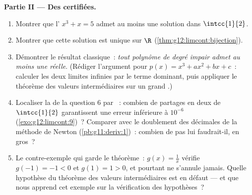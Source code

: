 \begin{problem}
\medskip
\noindent\textbf{Partie II --- Des  certifiées.}
\begin{enumerate}[resume]
  \item Montrer que l' $x^3 + x = 5$ admet au moins une
        solution dans $\intcc{1}{2}$.
  \item Montrer que cette solution est unique sur $\R$
        (\cref{thm:g12:limcont:bijection}).
  \item Démontrer le résultat classique~: \emph{tout polynôme de
        degré impair admet au moins une  réelle}. (Rédiger
        l'argument pour $p(x) = x^3 + a x^2 + b x + c$~: calculer
        les deux limites infinies par le terme dominant, puis
        appliquer le théorème des valeurs intermédiaires sur un
        grand .)
  \item Localiser la  de la question 6 par ~:
        combien de partages en deux de $\intcc{1}{2}$ garantissent
        une erreur inférieure à $10^{-6}$
        (\cref{exo:g12:limcont:9})~? Comparer avec le doublement des
        décimales de la méthode de Newton
        (\cref{pb:g11:deriv:1})~: combien de pas lui faudrait-il, en
        gros~?
  \item Le contre-exemple qui garde le théorème~: $g(x) = \frac1x$
        vérifie $g(-1) = -1 < 0$ et $g(1) = 1 > 0$, et pourtant ne
        s'annule jamais. Quelle hypothèse du théorème des valeurs
        intermédiaires est en défaut --- et que nous apprend cet
        exemple sur la vérification des hypothèses~?
\end{enumerate}


\end{problem}
